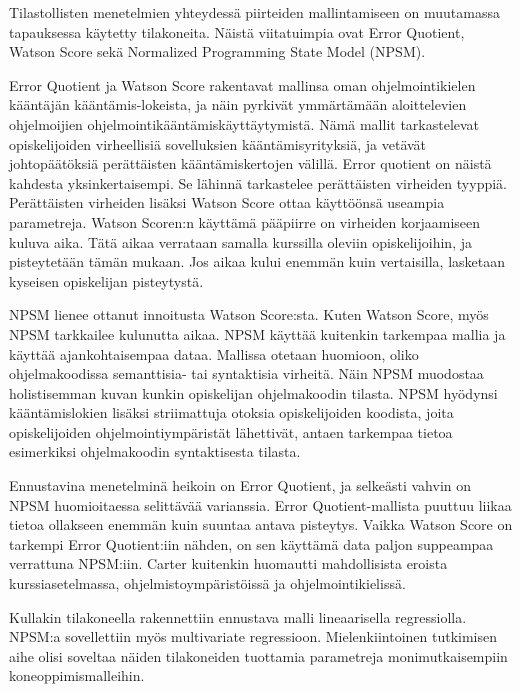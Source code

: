 \documentclass[finnish,twoside,openright]{HYgraduMLDS}
\begin{document}
Tilastollisten menetelmien yhteydessä piirteiden mallintamiseen on muutamassa tapauksessa käytetty tilakoneita. Näistä viitatuimpia ovat Error Quotient\cite{jadud2006methods}, Watson Score\cite{watson2013predicting} sekä Normalized Programming State Model (NPSM)\cite{carter2015normalized}. 

Error Quotient ja Watson Score rakentavat mallinsa oman ohjelmointikielen kääntäjän kääntämis-lokeista, ja näin pyrkivät ymmärtämään aloittelevien ohjelmoijien ohjelmointikääntämiskäyttäytymistä. Nämä mallit tarkastelevat opiskelijoiden virheellisiä sovelluksien kääntämisyrityksiä, ja vetävät johtopäätöksiä perättäisten kääntämiskertojen välillä. Error quotient on näistä kahdesta yksinkertaisempi. Se lähinnä tarkastelee perättäisten virheiden tyyppiä. Perättäisten virheiden lisäksi Watson Score ottaa käyttöönsä useampia parametreja. Watson Scoren:n käyttämä pääpiirre on virheiden korjaamiseen kuluva aika. Tätä aikaa verrataan samalla kurssilla oleviin opiskelijoihin, ja pisteytetään tämän mukaan. Jos aikaa kului enemmän kuin vertaisilla, lasketaan kyseisen opiskelijan pisteytystä.

NPSM lienee ottanut innoitusta Watson Score:sta. Kuten Watson Score, myös NPSM tarkkailee kulunutta aikaa. NPSM käyttää kuitenkin tarkempaa mallia ja käyttää ajankohtaisempaa dataa. Mallissa otetaan huomioon, oliko ohjelmakoodissa semanttisia- tai syntaktisia virheitä. Näin NPSM muodostaa holistisemman kuvan kunkin opiskelijan ohjelmakoodin tilasta. NPSM hyödynsi kääntämislokien lisäksi striimattuja otoksia opiskelijoiden koodista, joita opiskelijoiden ohjelmointiympäristät lähettivät, antaen tarkempaa tietoa esimerkiksi ohjelmakoodin syntaktisesta tilasta. 

Ennustavina menetelminä heikoin on Error Quotient, ja selkeästi vahvin on NPSM huomioitaessa selittävää varianssia\cite{carter2015normalized}. Error Quotient-mallista puuttuu liikaa tietoa ollakseen enemmän kuin suuntaa antava pisteytys\cite{jadud2006methods}. Vaikka Watson Score on tarkempi Error Quotient:iin nähden, on sen käyttämä data paljon suppeampaa verrattuna NPSM:iin\cite{carter2015normalized}. Carter kuitenkin huomautti mahdollisista eroista kurssiasetelmassa, ohjelmistoympäristöissä ja ohjelmointikielissä\cite{carter2015normalized}. 

Kullakin tilakoneella rakennettiin ennustava malli lineaarisella regressiolla. NPSM:a sovellettiin myös multivariate regressioon. Mielenkiintoinen tutkimisen aihe olisi soveltaa näiden tilakoneiden tuottamia parametreja monimutkaisempiin koneoppimismalleihin.
\end{document}
